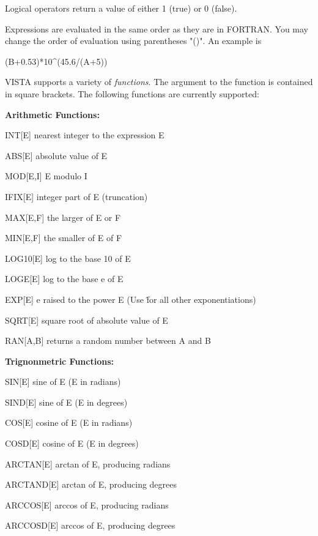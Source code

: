 Logical operators return a value of either 1 (true) or 0 (false).

Expressions are evaluated in the same order as they are in FORTRAN.  You
may change the order of evaluation using parentheses "()".  An example is
\begin{hanging}
  \item{(B+0.53)*10\^{ }(45.6/(A+5))}
\end{hanging}

VISTA supports a variety of \textit{functions}.  The argument to the
function is contained in square brackets.  The following functions are
currently supported:

\textbf{Arithmetic Functions:}
\begin{example}
  \item[INT{[E]}\hfill]{nearest integer to the expression E}
  \item[ABS{[E]}\hfill]{absolute value of E}
  \item[MOD{[E,I]}\hfill]{E modulo I}
  \item[IFIX{[E]}\hfill]{integer part of E (truncation)}
  \item[MAX{[E,F]}\hfill]{the larger of E or F}
  \item[MIN{[E,F]}\hfill]{the smaller of E of F}
  \item[LOG10{[E]}\hfill]{log to the base 10 of E}
  \item[LOGE{[E]}\hfill]{log to the base e of E}
  \item[EXP{[E]}\hfill]{e raised to the power E (Use \^ 
       for all other exponentiations)}
  \item[SQRT{[E]}\hfill]{square root of absolute value of E}
  \item[RAN{[A,B]}\hfill]{returns a random number between A and B}
\end{example}

\textbf{Trignonmetric Functions:}
\begin{example}
  \item[SIN{[E]}\hfill]{sine of E (E in radians)}
  \item[SIND{[E]}\hfill]{sine of E (E in degrees)}
  \item[COS{[E]}\hfill]{cosine of E (E in radians)}
  \item[COSD{[E]}\hfill]{cosine of E (E in degrees)}
  \item[ARCTAN{[E]}\hfill]{arctan of E, producing radians}
  \item[ARCTAND{[E]}\hfill]{arctan of E, producing degrees}
  \item[ARCCOS{[E]}\hfill]{arccos of E, producing radians}
  \item[ARCCOSD{[E]}\hfill]{arccos of E, producing degrees}
\end{example}

